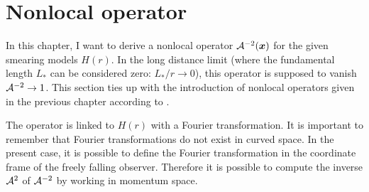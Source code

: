 \documentclass[12pt,a4paper]{report}
\numberwithin{equation}{chapter}
\begin{document}

\section{Nonlocal operator}\label{sec:H-nonlocal-op}

In this chapter, I want to derive a nonlocal operator ${\cal A}^{-2}(\boldsymbol{ x })$ for the given smearing models $H(r)$. In the long distance limit (where the fundamental length $L_*$ can be considered zero: $L_*/r\to 0$), this operator is supposed to vanish ${\cal A}^{-2} \to 1$. This section ties up with the introduction of nonlocal operators given in the previous chapter according to \cite{NFeb2012,MMN2010}.

The operator is linked to $H(r)$ with a Fourier transformation. It is important to remember that Fourier transformations do not exist in curved space. In the present case, it is possible to define the Fourier transformation in the coordinate frame of the freely falling observer. Therefore it is possible to compute the inverse ${\cal A}^2$ of ${\cal A}^{-2}$ by working in momentum space.
\end{document}
